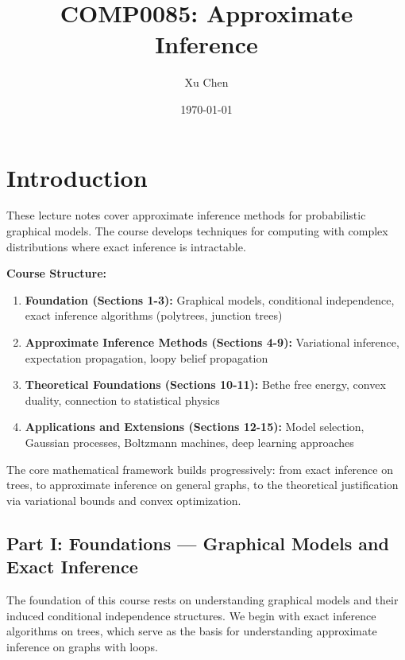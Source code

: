 \documentclass[12pt,a4paper]{article}
\title{COMP0085: Approximate Inference}
\author{Xu Chen}
\date{\today}
\theoremstyle{definition}
\begin{document}
\maketitle
\tableofcontents
\newpage

\section*{Introduction}

These lecture notes cover approximate inference methods for probabilistic graphical models. The course develops techniques for computing with complex distributions where exact inference is intractable.

\vspace{0.5cm}
\noindent\textbf{Course Structure:}
\begin{enumerate}
    \item \textbf{Foundation (Sections 1-3):} Graphical models, conditional independence, exact inference algorithms (polytrees, junction trees)
    \item \textbf{Approximate Inference Methods (Sections 4-9):} Variational inference, expectation propagation, loopy belief propagation
    \item \textbf{Theoretical Foundations (Sections 10-11):} Bethe free energy, convex duality, connection to statistical physics
    \item \textbf{Applications and Extensions (Sections 12-15):} Model selection, Gaussian processes, Boltzmann machines, deep learning approaches
\end{enumerate}

The core mathematical framework builds progressively: from exact inference on trees, to approximate inference on general graphs, to the theoretical justification via variational bounds and convex optimization.

\newpage
\vspace*{2cm}
\begin{center}
    \section*{\Large Part I: Foundations --- Graphical Models and Exact Inference}
\end{center}
\vspace*{1cm}
\nobreak

The foundation of this course rests on understanding graphical models and their induced conditional independence structures. We begin with exact inference algorithms on trees, which serve as the basis for understanding approximate inference on graphs with loops.
\end{document}
